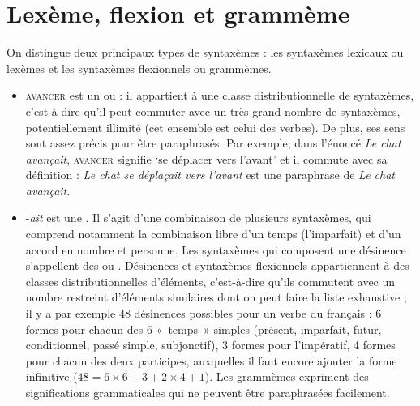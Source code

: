 \section{Lexème, flexion et grammème}\label{sec:2.2.13}

On distingue deux principaux types de syntaxèmes : les syntaxèmes lexicaux ou lexèmes et les syntaxèmes flexionnels ou grammèmes.

\begin{itemize}
\item \textsc{avancer} est un  ou  : il appartient à une classe distributionnelle  de syntaxèmes, c’est-à-dire qu’il peut commuter avec un très grand nombre de syntaxèmes, potentiellement illimité (cet ensemble est celui des verbes). De plus, ses sens sont assez précis pour être paraphrasés. Par exemple, dans l’énoncé \textit{Le chat avançait}, \textsc{avancer} signifie ‘se déplacer vers l’avant’ et il commute avec sa définition : \textit{Le chat se déplaçait vers l’avant} est une paraphrase de \textit{Le chat avançait}.
\item\sloppy -\textit{ait} est une . Il s’agit d’une combinaison de plusieurs syntaxèmes, qui comprend notamment la combinaison libre d’un temps (l’imparfait) et d’un accord en nombre et personne. Les syntaxèmes qui composent une désinence s’appellent des  ou . Désinences et syntaxèmes flexionnels appartiennent à des classes distributionnelles  d’éléments, c’est-à-dire qu’ils commutent avec un nombre restreint d’éléments similaires dont on peut faire la liste exhaustive ; il y a par exemple 48 désinences possibles pour un verbe du français : 6 formes pour chacun des 6 «~temps~» simples (présent, imparfait, futur, conditionnel, passé simple, subjonctif), 3 formes pour l'impératif, 4 formes pour chacun des deux participes, auxquelles il faut encore ajouter la forme infinitive ($48 = 6\times 6 + 3 + 2\times 4 + 1$). Les grammèmes expriment des significations grammaticales qui ne peuvent être paraphrasées facilement.
\end{itemize}

